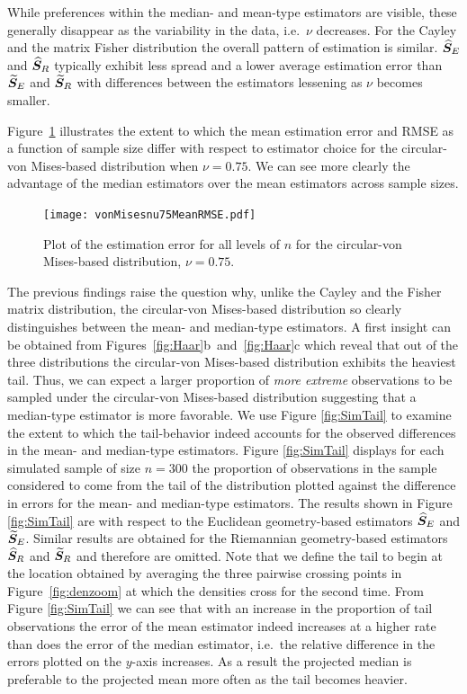 While preferences within the median- and mean-type estimators are visible, these generally disappear as the variability in the data, i.e.~$\nu$ decreases.  For the Cayley and the matrix Fisher distribution the overall pattern of estimation is similar. ${\widehat{\bm S}_E}$ and ${\widehat{\bm S}_R}$ typically exhibit less spread and a lower average estimation error than ${\widetilde{\bm S}_E}$ and ${\widetilde{\bm S}_R}$ with differences between the estimators lessening as $\nu$ becomes smaller.

Figure~\ref{fig:vmnu75} illustrates the extent to which the mean estimation error and RMSE as a function of sample size differ with respect to estimator choice for the circular-von Mises-based distribution when $\nu=0.75$.  We can see more clearly the advantage of the median estimators over the mean estimators across sample sizes.

\begin{figure}[h!]
\centering
\texttt{[image: vonMisesnu75MeanRMSE.pdf]}\vspace{-1em}
\caption{Plot of the estimation error for all levels of $n$ for the circular-von Mises-based distribution,  $\nu=0.75$.}  \label{fig:vmnu75}
\end{figure}%

The previous findings raise the question why, unlike the Cayley and the Fisher matrix distribution, the circular-von Mises-based distribution so clearly distinguishes between the mean- and median-type estimators. A first insight can be obtained from Figures~\ref{fig:Haar}b~and~\ref{fig:Haar}c which reveal that out of the three distributions the circular-von Mises-based distribution exhibits the heaviest tail. Thus, we can expect a larger proportion of   \textit{more extreme} observations to be sampled under the circular-von Mises-based distribution suggesting that a median-type estimator is more favorable. 
We use Figure \ref{fig:SimTail} to examine the extent to which the tail-behavior indeed accounts for the observed differences in the mean- and median-type estimators. Figure \ref{fig:SimTail} displays for each simulated sample of size $n=300$ the proportion of observations in the sample considered to come from the tail of the distribution plotted against the difference in errors for the mean- and median-type estimators.  The results shown in Figure \ref{fig:SimTail} are with respect to the Euclidean geometry-based estimators ${\widehat{\bm S}_E}$ and ${\widetilde{\bm S}_E}$. Similar results are obtained for the Riemannian geometry-based estimators ${\widehat{\bm S}_R}$ and ${\widetilde{\bm S}_R}$ and therefore are omitted. Note that we define the tail to begin at the location obtained by averaging the three pairwise crossing points in Figure~\ref{fig:denzoom} at which the densities cross for the second time. From Figure \ref{fig:SimTail} we can see that with an increase in the proportion of tail observations the error of the mean estimator indeed increases at a higher rate than does the error of the median estimator, i.e.~the relative difference in the errors plotted on the $y$-axis increases. As a result the projected median is preferable to the projected mean more often as the tail becomes heavier.
 
